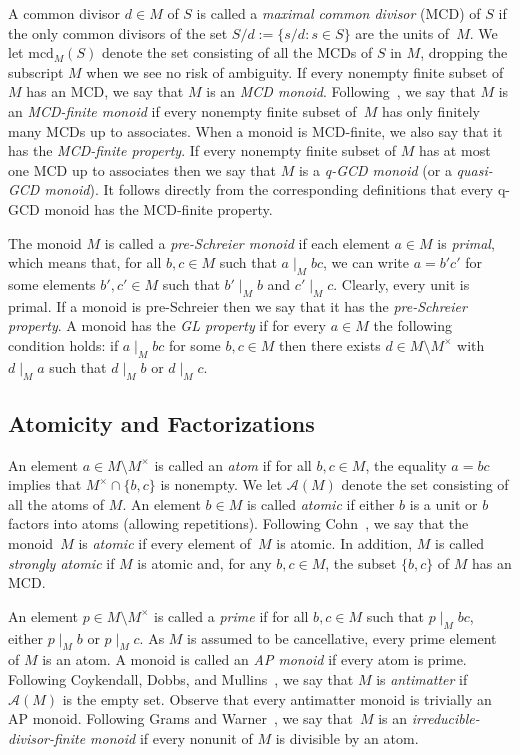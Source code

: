 \documentclass[10pt]{amsart}
\theoremstyle{definition}
\theoremstyle{remark}
\numberwithin{equation}{section}
\newcommand{\mcd}{\mathrm{mcd}}
\begin{document}
A common divisor $d \in M$ of $S$ is called a \emph{maximal common divisor} (MCD) of $S$ if the only common divisors of the set $S/d := \{s/d : s \in S\}$ are the units of~$M$. We let $\mcd_M(S)$ denote the set consisting of all the MCDs of $S$ in $M$, dropping the subscript $M$ when we see no risk of ambiguity. If every nonempty finite subset of $M$ has an MCD, we say that $M$ is an \emph{MCD monoid}. Following~\cite{EK18}, we say that $M$ is an \emph{MCD-finite monoid} if every nonempty finite subset of~$M$ has only finitely many MCDs up to associates. When a monoid is MCD-finite, we also say that it has the \emph{MCD-finite property}. If every nonempty finite subset of $M$ has at most one MCD up to associates then we say that $M$ is a \emph{q-GCD monoid} (or a \emph{quasi-GCD monoid}). It follows directly from the corresponding definitions that every q-GCD monoid has the MCD-finite property.
\smallskip

The monoid $M$ is called a \emph{pre-Schreier monoid} if each element $a \in M$ is \emph{primal}, which means that, for all $b,c \in M$ such that $a \mid_M bc$, we can write $a = b' c'$ for some elements $b', c' \in M$ such that $b' \mid_M b$ and $c' \mid_M c$. Clearly, every unit is primal. If a monoid is pre-Schreier then we say that it has the \emph{pre-Schreier property}. A monoid has the \emph{GL property} if for every $a \in M$ the following condition holds: if $a \mid_M bc$ for some $b,c \in M$ then there exists $d \in M \setminus M^\times$ with $d \mid_M a$ such that $d \mid_M b$ or $d \mid_M c$.



\medskip
\subsection{Atomicity and Factorizations}

An element $a \in M \setminus M^\times$ is called an \emph{atom} if for all $b,c \in M$, the equality $a = bc$ implies that $M^\times \cap \{b,c\}$ is nonempty. We let $\mathcal{A}(M)$ denote the set consisting of all the atoms of $M$. An element $b \in M$ is called \emph{atomic} if either $b$ is a unit or $b$ factors into atoms (allowing repetitions). Following Cohn~\cite{pC68}, we say that the monoid~$M$ is \emph{atomic} if every element of~$M$ is atomic. In addition, $M$ is called \emph{strongly atomic} if $M$ is atomic and, for any $b,c \in M$, the subset $\{b,c\}$ of $M$ has an MCD.
\smallskip

An element $p \in M \setminus M^\times$ is called a \emph{prime} if for all $b,c \in M$ such that $p \mid_M bc$, either $p \mid_M b$ or $p \mid_M c$. As $M$ is assumed to be cancellative, every prime element of $M$ is an atom. A monoid is called an \emph{AP monoid} if every atom is prime. Following Coykendall, Dobbs, and Mullins~\cite{CDM99}, we say that $M$ is \emph{antimatter} if $\mathcal{A}(M)$ is the empty set. Observe that every antimatter monoid is trivially an AP monoid. Following Grams and Warner~\cite{GW75}, we say that~$M$ is an \emph{irreducible-divisor-finite monoid} if every nonunit of $M$ is divisible by an atom.
\smallskip
\end{document}
